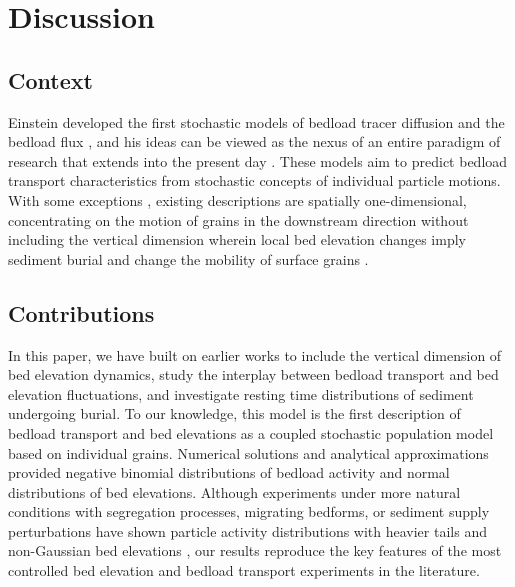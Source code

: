 \documentclass[draft]{agujournal2018}
\begin{document}
\section{Discussion}
\label{sec:discussion}

\subsection{Context}
Einstein developed the first stochastic models of bedload tracer diffusion \citep{Einstein1937} and the bedload flux \citep{Einstein1950}, and his ideas can be viewed as the nexus of an entire paradigm of research that extends into the present day \citep[e.g.,][]{Hubbell1964, Nakagawa1976,Hassan1991,Ancey2008, Wu2019}.
These models aim to predict bedload transport characteristics from stochastic concepts of individual particle motions.
With some exceptions \citep{Yang1971,Nakagawa1980,Pelosi2016,Wu2019,Wu2019a}, existing descriptions are spatially one-dimensional, concentrating on the motion of grains in the downstream direction without including the vertical dimension wherein local bed elevation changes imply sediment burial \citep{Voepel2013,Martin2014} and change the mobility of surface grains \citep{Yang1971,Nakagawa1980}.

\subsection{Contributions}

In this paper, we have built on earlier works \citep{Ancey2008,Martin2014} to include the vertical dimension of bed elevation dynamics, study the interplay between bedload transport and bed elevation fluctuations, and investigate resting time distributions of sediment undergoing burial.
To our knowledge, this model is the first description of bedload transport and bed elevations as a coupled stochastic population model based on individual grains.
Numerical solutions and analytical approximations provided negative binomial distributions of bedload activity and normal distributions of bed elevations.
Although experiments under more natural conditions with segregation processes,  migrating bedforms, or sediment supply perturbations have shown particle activity distributions with heavier tails \citep{Dhont2018,Saletti2015a} and non-Gaussian bed elevations \citep{Singh2012,Aberle2006}, our results reproduce the key features of the most controlled bed elevation \citep{Wong2007,Martin2014} and bedload transport \citep{Heyman2016,Ancey2008} experiments in the literature.
\end{document}

